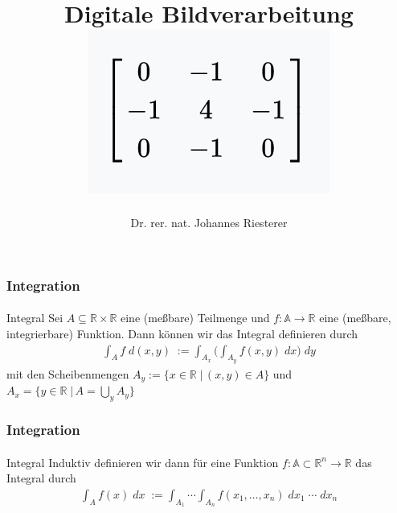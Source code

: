 \documentclass{beamer}
\begin{document}
\title[Digitale Bildverarbeitung] %
{Digitale Bildverarbeitung
\\
\includegraphics[scale=1.0]{img/cover}
}
\subtitle{}
\author[Dr. Johannes Riesterer] %
{Dr.  rer. nat. Johannes Riesterer}

\date[KPT 2004] %
{}

\subject{Digitale Bildverarbeitung}

\frame{\titlepage}


\begin{frame}
    \frametitle{Integration}
\framesubtitle{}

    \begin{block}{Integral}
Sei $A \subseteq \mathbb{R} \times \mathbb{R}$ eine (meßbare) Teilmenge und  $f: \mathbb{A} \to \mathbb{R}$ eine (meßbare, integrierbare) Funktion.
Dann können wir das Integral definieren durch
\begin{align*}
\int_A f  \; d (x,y) \;  := \int_{A_x} \Biggl( \int_{A_y} f(x,y) \;  dx \Biggr) \; dy 
\end{align*}
mit den Scheibenmengen $A_y := \{x \in \mathbb{R} \;  | \, (x,y) \in A \}$ und $A_x =  \{y \in \mathbb{R} \;  | \, A = \bigcup_y A_y \}$
\end{block}

 \end{frame}


\begin{frame}
    \frametitle{Integration}
\framesubtitle{}

    \begin{block}{Integral}
Induktiv definieren wir dann  für eine Funktion $f: \mathbb{A} \subset \mathbb{R}^n \to \mathbb{R}$
das Integral  durch
\begin{align*}
\int_A f(x)  \; dx\;  := \int_{A_{1}} \cdots \int_{A_{n}} f(x_1, \ldots,   x_n) \;  dx_1  \;  \cdots \; dx_n 
\end{align*}

\end{block}

 \end{frame}
\end{document}
